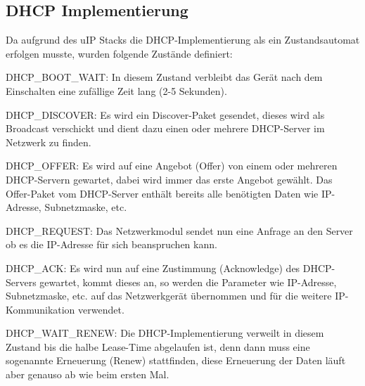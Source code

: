\documentclass[a4paper,14pt,headsepline]{scrartcl}
\begin{document}
\newpage

\subsection{DHCP Implementierung}
Da aufgrund des uIP Stacks die DHCP-Implementierung als ein Zustandsautomat erfolgen musste, wurden folgende Zustände definiert:

DHCP\_BOOT\_WAIT: In diesem Zustand verbleibt das Gerät nach dem Einschalten eine zufällige Zeit lang (2-5 Sekunden).

DHCP\_DISCOVER: Es wird ein Discover-Paket gesendet, dieses wird als Broadcast verschickt und dient dazu einen oder mehrere DHCP-Server im Netzwerk zu finden.

DHCP\_OFFER: Es wird auf eine Angebot (Offer) von einem oder mehreren DHCP-Servern gewartet, dabei wird immer das erste Angebot gewählt. Das Offer-Paket vom DHCP-Server enthält bereits alle benötigten Daten wie IP-Adresse, Subnetzmaske, etc.

DHCP\_REQUEST: Das Netzwerkmodul sendet nun eine Anfrage an den Server ob es die IP-Adresse für sich beanspruchen kann.

DHCP\_ACK: Es wird nun auf eine Zustimmung (Acknowledge) des DHCP-Servers gewartet, kommt dieses an, so werden die Parameter wie IP-Adresse, Subnetzmaske, etc. auf das Netzwerkgerät übernommen und für die weitere IP-Kommunikation verwendet.

DHCP\_WAIT\_RENEW: Die DHCP-Implementierung verweilt in diesem Zustand bis die halbe Lease-Time abgelaufen ist, denn dann muss eine sogenannte Erneuerung (Renew) stattfinden, diese Erneuerung der Daten läuft aber genauso ab wie beim ersten Mal.
\end{document}
